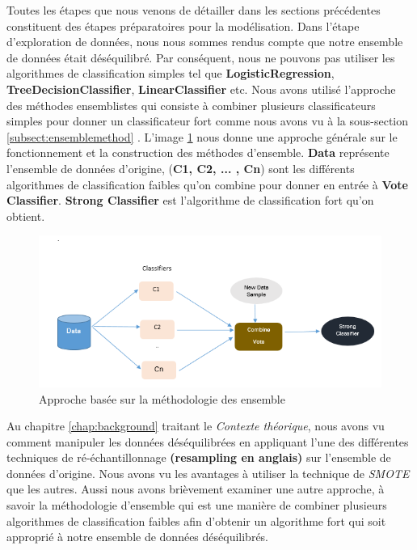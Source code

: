 \documentclass[12pt, french]{report}
\begin{document}
Toutes les étapes que nous venons de détailler dans les sections précédentes constituent des étapes préparatoires pour la modélisation. Dans l'étape d'exploration de données, nous nous sommes rendus compte que notre ensemble de données était déséquilibré. Par conséquent, nous ne pouvons pas utiliser les algorithmes de classification simples tel que \textbf{LogisticRegression}, \textbf{TreeDecisionClassifier}, \textbf{LinearClassifier} etc. Nous avons utilisé l'approche des méthodes ensemblistes qui consiste à combiner plusieurs classificateurs simples pour donner un classificateur fort comme nous avons vu à la sous-section \ref{subsect:ensemblemethod} . L'image \ref{ensemble} nous donne une approche générale sur le fonctionnement et la construction des méthodes d'ensemble. \textbf{Data} représente l'ensemble de données d'origine, (\textbf{C1, C2, ... , Cn}) sont les différents algorithmes de classification faibles qu'on combine pour donner en entrée à \textbf{Vote Classifier}. \textbf{Strong Classifier} est l'algorithme de classification fort qu'on obtient. \\

\begin{figure}[h]
	\includegraphics{images/ensemble.png}
	\caption{Approche basée sur la méthodologie des ensemble \cite{key19} }
	\label{ensemble}
\end{figure}

Au chapitre \ref{chap:background} traitant le \textit{Contexte théorique}, nous avons vu comment manipuler les données déséquilibrées en appliquant l'une des différentes techniques de ré-échantillonnage \textbf{(resampling en anglais)} sur l'ensemble de données d'origine. Nous avons vu les avantages à utiliser la technique de \textit{SMOTE} que les autres. Aussi nous avons brièvement examiner une autre approche, à savoir la méthodologie d'ensemble qui est une manière de combiner plusieurs algorithmes de classification faibles afin d'obtenir un algorithme fort qui soit approprié à notre ensemble de données déséquilibrés. \\
\end{document}
